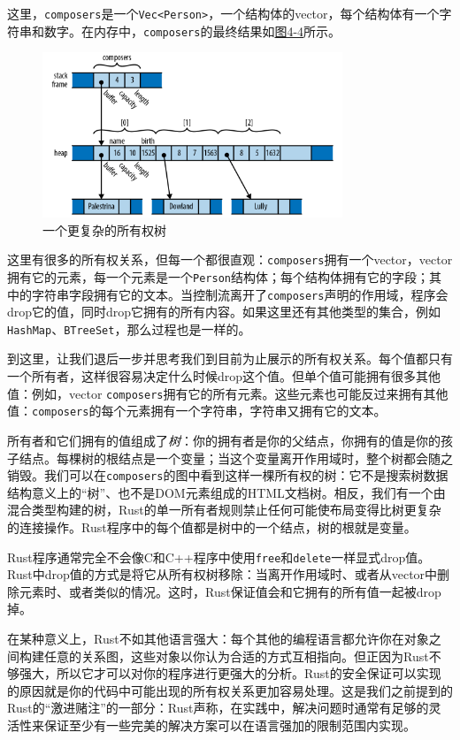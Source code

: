 这里，\texttt{composers}是一个\texttt{Vec<Person>}，一个结构体的vector，每个结构体有一个字符串和数字。在内存中，\texttt{composers}的最终结果如\hyperref[f4-4]{图4-4}所示。

\begin{figure}[htbp]
    \centering
    \includegraphics[width=0.8\textwidth]{../img/f4-4.png}
    \caption{一个更复杂的所有权树}
    \label{f4-4}
\end{figure}

这里有很多的所有权关系，但每一个都很直观：\texttt{composers}拥有一个vector，vector拥有它的元素，每一个元素是一个\texttt{Person}结构体；每个结构体拥有它的字段；其中的字符串字段拥有它的文本。当控制流离开了\texttt{composers}声明的作用域，程序会drop它的值，同时drop它拥有的所有内容。如果这里还有其他类型的集合，例如\texttt{HashMap}、\texttt{BTreeSet}，那么过程也是一样的。

到这里，让我们退后一步并思考我们到目前为止展示的所有权关系。每个值都只有一个所有者，这样很容易决定什么时候drop这个值。但单个值可能拥有很多其他值：例如，vector \texttt{composers}拥有它的所有元素。这些元素也可能反过来拥有其他值：\texttt{composers}的每个元素拥有一个字符串，字符串又拥有它的文本。

所有者和它们拥有的值组成了\emph{树}：你的拥有者是你的父结点，你拥有的值是你的孩子结点。每棵树的根结点是一个变量；当这个变量离开作用域时，整个树都会随之销毁。我们可以在\texttt{composers}的图中看到这样一棵所有权的树：它不是搜索树数据结构意义上的“树”、也不是DOM元素组成的HTML文档树。相反，我们有一个由混合类型构建的树，Rust的单一所有者规则禁止任何可能使布局变得比树更复杂的连接操作。Rust程序中的每个值都是树中的一个结点，树的根就是变量。

Rust程序通常完全不会像C和C++程序中使用\texttt{free}和\texttt{delete}一样显式drop值。Rust中drop值的方式是将它从所有权树移除：当离开作用域时、或者从vector中删除元素时、或者类似的情况。这时，Rust保证值会和它拥有的所有值一起被drop掉。

在某种意义上，Rust不如其他语言强大：每个其他的编程语言都允许你在对象之间构建任意的关系图，这些对象以你认为合适的方式互相指向。但正因为Rust不够强大，所以它才可以对你的程序进行更强大的分析。Rust的安全保证可以实现的原因就是你的代码中可能出现的所有权关系更加容易处理。这是我们之前提到的Rust的“激进赌注”的一部分：Rust声称，在实践中，解决问题时通常有足够的灵活性来保证至少有一些完美的解决方案可以在语言强加的限制范围内实现。

